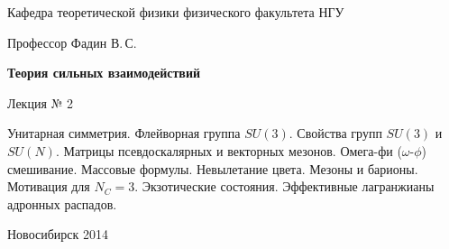 \documentclass[12pt,pagesize,paper=landscape,paper=192mm:108mm]{scrbook}
\begin{document}
\begin{titlepage}
\begin{center}
    Кафедра теоретической физики физического факультета НГУ
    \medskip

    \Large
    Профессор Фадин В.\,С.

    \huge
    \textbf{Теория сильных взаимодействий}
    \smallskip

    \Large
    Лекция № 2
    \vfill

    \normalsize
    \begin{minipage}{0.65\linewidth}
      Унитарная симметрия. Флейворная группа $SU(3)$. Свойства групп
      $SU(3)$ и $SU(N)$. Матрицы псевдоскалярных и векторных
      мезонов. Омега-фи ($\omega$-$\phi$) смешивание. Массовые
      формулы. Невылетание цвета. Мезоны и барионы. Мотивация для
      $N_C=3$. Экзотические состояния. Эффективные лагранжианы
      адронных распадов.
    \end{minipage}
    \vfill

    \normalsize \ccbysa\hspace{0.5em} Новосибирск 2014   
  \end{center}
\end{titlepage}
\end{document}
